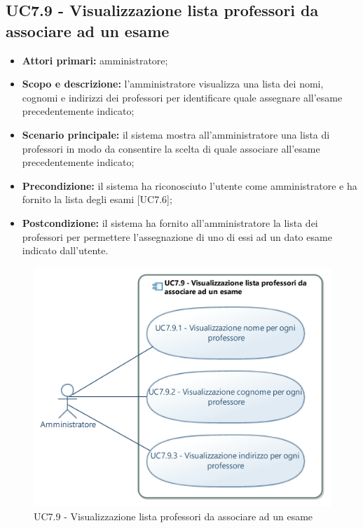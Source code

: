 \documentclass[AnalisiDeiRequisiti.tex]{subfiles}
\begin{document}
\subsection{UC7.9 - Visualizzazione lista professori da associare ad un esame}
\begin{itemize}
	\item \textbf{Attori primari:} amministratore;
	\item \textbf{Scopo e descrizione:} l'amministratore visualizza una lista dei nomi, cognomi e indirizzi dei professori per identificare quale assegnare all'esame precedentemente indicato;
	\item \textbf{Scenario principale:} il sistema mostra all'amministratore una lista di professori in modo da consentire la scelta di quale associare all'esame precedentemente indicato;
	\item \textbf{Precondizione:} il sistema ha riconosciuto l'utente come amministratore e ha fornito la lista degli esami [UC7.6];  
	\item \textbf{Postcondizione:} il sistema ha fornito all'amministratore la lista dei professori per permettere l'assegnazione di uno di essi ad un dato esame indicato dall'utente.
\end{itemize}
\begin{figure}[H]
	\centering
	\includegraphics[width=0.7\linewidth]{UC7_9.jpg}
	\caption{UC7.9 - Visualizzazione lista professori da associare ad un esame}
	\label{UC7.9 - Visualizzazione lista professori da associare ad un esame}
\end{figure}
\end{document}
